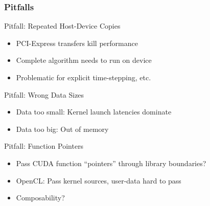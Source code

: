 \begin{frame}[fragile]
\frametitle{Pitfalls}
  \begin{block}{Pitfall: Repeated Host-Device Copies}
  \begin{itemize}
   \item PCI-Express transfers kill performance
   \item Complete algorithm needs to run on device
   \item Problematic for explicit time-stepping, etc.
  \end{itemize}
  \end{block}

  
  \begin{block}{Pitfall: Wrong Data Sizes}
  \begin{itemize}
   \item Data too small: Kernel launch latencies dominate
   \item Data too big: Out of memory
  \end{itemize}
  \end{block}

  
  \begin{block}{Pitfall: Function Pointers}
  \begin{itemize}
   \item Pass CUDA function ``pointers'' through library boundaries?
   \item OpenCL: Pass kernel sources, user-data hard to pass
   \item Composability?
  \end{itemize}
  \end{block}

\end{frame}



